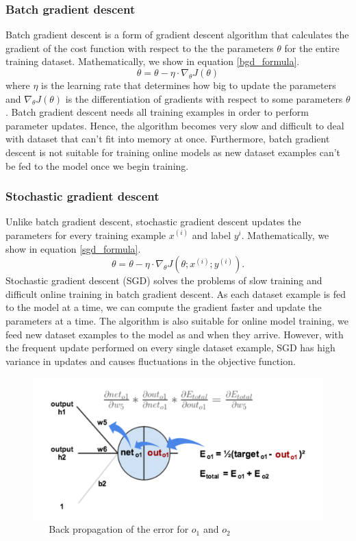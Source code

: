 \documentclass[master]{thesis-uestc}
\begin{document}
\subsubsection*{Batch gradient descent}
Batch gradient descent is a form of gradient descent algorithm that calculates the gradient of the cost function with respect to the the parameters $\theta$ for the entire training dataset. Mathematically, we show in equation \ref{bgd_formula}.
\begin{equation}
    \theta = \theta - \eta \cdot \nabla_\theta J(\theta)
\label{bgd_formula}
\end{equation}
where $\eta$ is the learning rate that determines how big to update the parameters and $\nabla_\theta J(\theta)$ is the differentiation of gradients with respect to some parameters $\theta$. Batch gradient descent needs all training examples in order to perform parameter updates. Hence, the algorithm becomes very slow and difficult to deal with dataset that can't fit into memory at once. Furthermore, batch gradient descent is not suitable for training online models as new dataset examples can't be fed to the model once we begin training. 

\subsubsection*{Stochastic gradient descent}
Unlike batch gradient descent, stochastic gradient descent updates the parameters for every training example $x^{(i)}$ and label $y^{i}$. Mathematically, we show in equation \ref{sgd_formula}.
\begin{equation}
    \theta = \theta - \eta \cdot\nabla_\theta J(\theta;x^{(i)};y^{(i)}).
\label{sgd_formula}
\end{equation}
Stochastic gradient descent (SGD) solves the problems of slow training and difficult online training in batch gradient descent. As each dataset example is fed to the model at a time, we can compute the gradient faster and update the parameters at a time. The algorithm is also suitable for online model training, we feed new dataset examples to the model as and when they arrive. However, with the frequent update performed on every single dataset example, SGD has high variance in updates and causes fluctuations in the objective function.

\begin{figure}[ht]
\includegraphics[width=5in]{pic/output_1_backprop-4.png}
\caption{\,\,\,\,\,\,\,\,\,\,Back propagation of the error for $o_1$ and $o_2$}
\label{output_1_backprop}
\end{figure}
\end{document}
